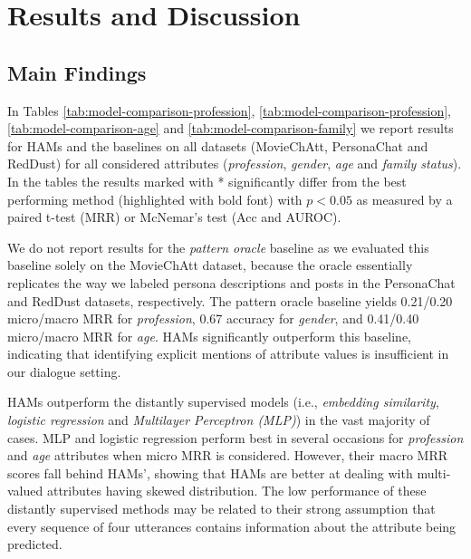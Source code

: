 
\section{Results and Discussion}
\label{results}


\subsection{Main Findings}
\label{findings}

In Tables \ref{tab:model-comparison-profession}, \ref{tab:model-comparison-profession}, \ref{tab:model-comparison-age} and \ref{tab:model-comparison-family} we report results for HAMs and the baselines on all datasets (MovieChAtt, PersonaChat and RedDust) for all considered attributes (\textit{profession}, \textit{gender}, \textit{age} and \textit{family status}).
In the tables the results marked with * significantly differ from 
the best performing method (highlighted with bold font)
with $p < 0.05$ as measured by a paired t-test (MRR) or McNemar's test (Acc and AUROC).




We do not report results for the \textit{pattern oracle} baseline as we evaluated this baseline solely on the MovieChAtt dataset, because the oracle essentially replicates the way we labeled persona descriptions and posts in the PersonaChat and RedDust datasets, respectively.
The pattern oracle baseline yields 0.21/0.20 micro/macro MRR for \textit{profession}, 0.67 accuracy for \textit{gender}, and 0.41/0.40 micro/macro MRR for \textit{age}. HAMs significantly outperform this baseline, indicating that identifying explicit mentions of attribute values is insufficient in our dialogue setting.

HAMs outperform the distantly supervised models (i.e., \textit{embedding similarity}, \textit{logistic regression} and \textit{Multilayer Perceptron (MLP)}) in the vast majority of cases.
MLP and logistic regression perform best in several occasions for \textit{profession} and \textit{age} attributes when micro MRR is considered. However, their macro MRR scores fall behind HAMs', showing that HAMs are better at dealing with multi-valued attributes having skewed distribution.
The low performance of these distantly supervised methods may be related to their strong assumption that every sequence of four utterances contains information about the attribute being predicted.

